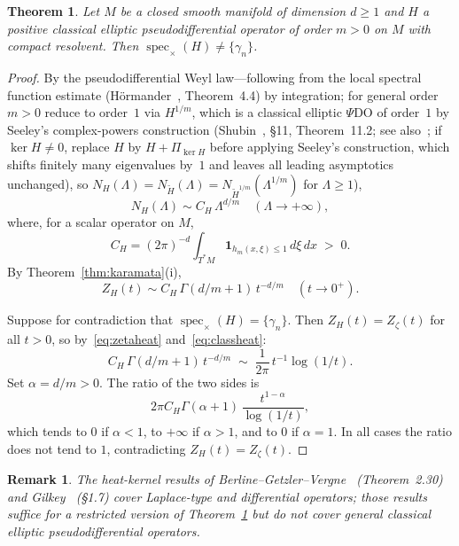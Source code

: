 \documentclass[12pt]{amsart}
\newtheorem{remark}[theorem]{Remark}
\newtheorem{mainthm}{Theorem}
\begin{document}
\begin{mainthm}
\label{thm:D}
Let $M$ be a closed smooth manifold of dimension $d\ge 1$ and $H$ a
positive classical elliptic pseudodifferential operator of order $m>0$
on $M$ with compact resolvent.  Then
$\operatorname{spec}_{\times}(H)\ne\{\gamma_n\}$.
\end{mainthm}

\begin{proof}
By the pseudodifferential Weyl law---following from the local spectral
function estimate (H\"ormander~\cite{Hormander1968}, Theorem~4.4) by
integration; for general order $m>0$
reduce to order~$1$ via $H^{1/m}$, which is a classical elliptic
$\Psi$DO of order~$1$ by Seeley's complex-powers
construction (Shubin~\cite{Shubin2001}, \S11, Theorem~11.2;
see also~\cite{Seeley1967}; if $\ker H\ne 0$, replace $H$ by
$H+\Pi_{\ker H}$ before applying Seeley's construction, which
shifts finitely many eigenvalues by~$1$ and leaves all leading
asymptotics unchanged), so
$N_H(\Lambda)=N_{\widetilde H}(\Lambda)=N_{\widetilde{H}^{1/m}}(\Lambda^{1/m})$
for $\Lambda\ge 1$),
\[
  N_H(\Lambda)\sim C_H\,\Lambda^{d/m}
  \quad(\Lambda\to+\infty),
\]
where, for a scalar operator on $M$,
\[
  C_H=(2\pi)^{-d}\int_{T^*M}\mathbf{1}_{h_m(x,\xi)\le 1}\,d\xi\,dx\;>\;0.
\]
By Theorem~\ref{thm:karamata}(i),
\begin{equation}
  \label{eq:classheat}
  Z_H(t)\sim C_H\,\Gamma(d/m+1)\,t^{-d/m}
  \quad(t\to 0^+).
\end{equation}

Suppose for contradiction that $\operatorname{spec}_{\times}(H)=\{\gamma_n\}$.
Then $Z_H(t)=Z_\zeta(t)$ for all $t>0$, so
by~\eqref{eq:zetaheat} and~\eqref{eq:classheat}:
\[
  C_H\,\Gamma(d/m+1)\,t^{-d/m}
  \;\sim\;
  \frac{1}{2\pi}\,t^{-1}\log(1/t).
\]
Set $\alpha=d/m>0$.  The ratio of the two sides is
\[
  2\pi C_H\Gamma(\alpha+1)\,
  \frac{t^{1-\alpha}}{\log(1/t)},
\]
which tends to $0$ if $\alpha<1$, to $+\infty$ if $\alpha>1$, and to
$0$ if $\alpha=1$.  In all cases the ratio does not tend to $1$,
contradicting $Z_H(t)=Z_\zeta(t)$.
\end{proof}

\begin{remark}
\label{rem:bgvgilkey}
The heat-kernel results of Berline--Getzler--Vergne~\cite{BGV2004}
(Theorem~2.30) and Gilkey~\cite{Gilkey1995} (\S1.7) cover
Laplace-type and differential operators; those results suffice for
a restricted version of Theorem~\ref{thm:D} but do not cover general
classical elliptic pseudodifferential operators.
\end{remark}
\end{document}
